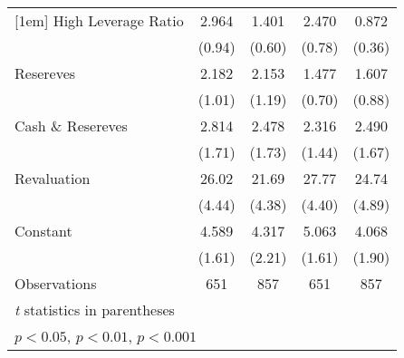 {\begin{tabular}{l*{4}{c}}
[1em]
High Leverage Ratio&    2.964         &    1.401         &    2.470         &    0.872         \\
                &   (0.94)         &   (0.60)         &   (0.78)         &   (0.36)         \\
[1em]
Resereves       &    2.182         &    2.153         &    1.477         &    1.607         \\
                &   (1.01)         &   (1.19)         &   (0.70)         &   (0.88)         \\
[1em]
Cash \& Resereves&    2.814         &    2.478         &    2.316         &    2.490         \\
                &   (1.71)         &   (1.73)         &   (1.44)         &   (1.67)         \\
[1em]
Revaluation     &    26.02\sym{***}&    21.69\sym{***}&    27.77\sym{***}&    24.74\sym{***}\\
                &   (4.44)         &   (4.38)         &   (4.40)         &   (4.89)         \\
[1em]
Constant        &    4.589         &    4.317\sym{*}  &    5.063         &    4.068         \\
                &   (1.61)         &   (2.21)         &   (1.61)         &   (1.90)         \\
\hline
Observations    &      651         &      857         &      651         &      857         \\
\hline\hline
\multicolumn{5}{l}{\footnotesize \textit{t} statistics in parentheses}\\
\multicolumn{5}{l}{\footnotesize \sym{*} \(p<0.05\), \sym{**} \(p<0.01\), \sym{***} \(p<0.001\)}\\
\end{tabular}
}
